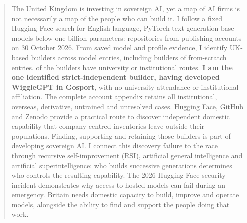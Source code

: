 \begin{abstract}
The United Kingdom is investing in sovereign AI, yet a map of AI firms
is not necessarily a map of the people who can build it. I follow
a fixed Hugging Face search for English-language, PyTorch text-generation
base models below one billion parameters: \CensusModels{} repositories from
\CensusAccounts{} publishing accounts on 30 October 2026. From saved model and
profile evidence, I identify \UKBuilders{} UK-based builders across
\UKBuiltModels{} model entries, including \ScratchBuilders{} builders of
\ScratchModels{} from-scratch entries. \UKInstitutional{} of the \UKBuilders{} builders have
university or institutional routes. \textbf{I am the one identified
strict-independent builder, having developed WiggleGPT in Gosport}, with no university
attendance or institutional affiliation. The complete account appendix
retains all institutional, overseas, derivative, untrained and unresolved
cases. Hugging Face, GitHub and Zenodo provide a practical route to discover
independent domestic capability that company-centred inventories leave
outside their populations. Finding, supporting and retaining those builders
is part of developing sovereign AI. I connect this discovery failure to
the race through recursive self-improvement (RSI), artificial general
intelligence and artificial superintelligence: who builds successive
generations determines who controls the resulting capability. The 2026
Hugging Face security incident demonstrates why access to hosted models
can fail during an emergency. Britain needs domestic capacity to build,
improve and operate models, alongside the ability to find and support the
people doing that work.
\end{abstract}
